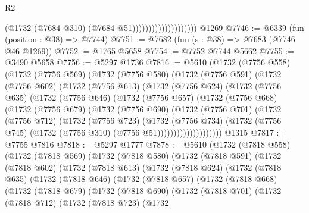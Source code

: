 \begin{lexlean}{R2}
\begin{coremodule}
                                        (@1732 (@7684 @310) (@7684 @51))))))))))))))))))))
    @1269
@7746 := @6339 (fun (position : @38) => @7744)
@7751 := @7682 (fun (s : @38) => @7683 (@7746 @46 @1269))
@7752 := @1765 @5658
@7754 := @7752 @7744 @5662
@7755 := @3490 @5658
@7756 := @5297 @1736
@7816 := @5610
    (@1732
      (@7756 @558)
      (@1732
        (@7756 @569)
        (@1732
          (@7756 @580)
          (@1732
            (@7756 @591)
            (@1732
              (@7756 @602)
              (@1732
                (@7756 @613)
                (@1732
                  (@7756 @624)
                  (@1732
                    (@7756 @635)
                    (@1732
                      (@7756 @646)
                      (@1732
                        (@7756 @657)
                        (@1732
                          (@7756 @668)
                          (@1732
                            (@7756 @679)
                            (@1732
                              (@7756 @690)
                              (@1732
                                (@7756 @701)
                                (@1732
                                  (@7756 @712)
                                  (@1732
                                    (@7756 @723)
                                    (@1732
                                      (@7756 @734)
                                      (@1732
                                        (@7756 @745)
                                        (@1732 (@7756 @310) (@7756 @51))))))))))))))))))))
    @1315
@7817 := @7755 @7816
@7818 := @5297 @1777
@7878 := @5610
    (@1732
      (@7818 @558)
      (@1732
        (@7818 @569)
        (@1732
          (@7818 @580)
          (@1732
            (@7818 @591)
            (@1732
              (@7818 @602)
              (@1732
                (@7818 @613)
                (@1732
                  (@7818 @624)
                  (@1732
                    (@7818 @635)
                    (@1732
                      (@7818 @646)
                      (@1732
                        (@7818 @657)
                        (@1732
                          (@7818 @668)
                          (@1732
                            (@7818 @679)
                            (@1732
                              (@7818 @690)
                              (@1732
                                (@7818 @701)
                                (@1732
                                  (@7818 @712)
                                  (@1732
                                    (@7818 @723)
                                    (@1732

\end{coremodule}
\end{lexlean}
